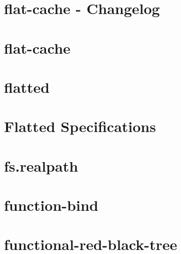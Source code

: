 \let\mypdfximage\pdfximage\def\pdfximage{\immediate\mypdfximage}\documentclass[twoside]{book}
\newcommand{\+}{\discretionary{\mbox{\scriptsize$\hookleftarrow$}}{}{}}
\begin{document}
\chapter{flat-\/cache -\/ Changelog}
\label{md_heap-visualizer_node_modules_flat-cache_changelog}

\chapter{flat-\/cache}
\label{md_heap-visualizer_node_modules_flat-cache__r_e_a_d_m_e}

\chapter{flatted}
\label{md_heap-visualizer_node_modules_flatted__r_e_a_d_m_e}

\chapter{Flatted Specifications}
\label{md_heap-visualizer_node_modules_flatted__s_p_e_c_s}

\chapter{fs.\+realpath}
\label{md_heap-visualizer_node_modules_fs_8realpath__r_e_a_d_m_e}

\chapter{function-\/bind}
\label{md_heap-visualizer_node_modules_function-bind__r_e_a_d_m_e}

\chapter{functional-\/red-\/black-\/tree}
\label{md_heap-visualizer_node_modules_functional-red-black-tree__r_e_a_d_m_e}

\end{document}
